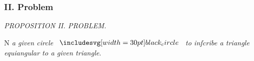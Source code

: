 \documentclass[12pt,preview]{standalone}
\begin{document}
\subsubsection{II. Problem}

\begin{minipage}[t]{0.33\textwidth}
    \vspace{40pt}
    
\end{minipage}%
\hfill
\begin{minipage}[t]{0.64\textwidth}
    \vspace{0pt}

    \begin{center}
        \textit{PROPOSITION II. PROBLEM.}\label{book4pr2} \\
    \end{center}

    \hfill

    \begin{center}
        \raggedright \lettrine[lines=4, loversize=1, nindent=0pt]{}{}N \textit{a given circle} $\img[0][0][30]{black_circle}$ \textit{to inſcribe a triangle\\ equiangular to a given triangle}.
    \end{center}

    \hfill

    \hfill

    \hfill


\end{minipage}
\end{document}
